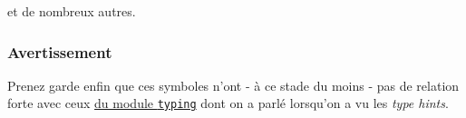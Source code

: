 et de nombreux autres.

    \hypertarget{avertissement}{%
\subsubsection{Avertissement}\label{avertissement}}

    Prenez garde enfin que ces symboles n'ont - à ce stade du moins - pas de
relation forte avec ceux
\href{https://docs.python.org/3/library/typing.html}{du module
\texttt{typing}} dont on a parlé lorsqu'on a vu les \emph{type hints}.


    
    
    
